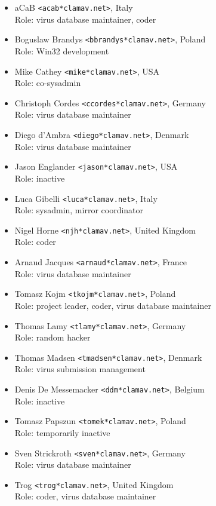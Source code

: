 \documentclass[a4paper,titlepage,12pt]{article}
\newcommand{\email}[1]{\texttt{#1}}
\begin{document}
    \begin{itemize}
	\item aCaB \email{<acab*clamav.net>}, Italy\\
	Role: virus database maintainer, coder

	\item Boguslaw Brandys \email{<bbrandys*clamav.net>}, Poland\\
	Role: Win32 development

	\item Mike Cathey \email{<mike*clamav.net>}, USA\\
	Role: co-sysadmin

	\item Christoph Cordes \email{<ccordes*clamav.net>}, Germany\\
	Role: virus database maintainer

	\item Diego d'Ambra \email{<diego*clamav.net>}, Denmark\\
	Role: virus database maintainer

	\item Jason Englander \email{<jason*clamav.net>}, USA\\
	Role: inactive

	\item Luca Gibelli \email{<luca*clamav.net>}, Italy\\
	Role: sysadmin, mirror coordinator

	\item Nigel Horne \email{<njh*clamav.net>}, United Kingdom\\
	Role: coder

	\item Arnaud Jacques \email{<arnaud*clamav.net>}, France\\
	Role: virus database maintainer

	\item Tomasz Kojm \email{<tkojm*clamav.net>}, Poland\\
	Role: project leader, coder, virus database maintainer

	\item Thomas Lamy \email{<tlamy*clamav.net>}, Germany\\
	Role: random hacker

	\item Thomas Madsen \email{<tmadsen*clamav.net>}, Denmark\\
	Role: virus submission management

	\item Denis De Messemacker \email{<ddm*clamav.net>}, Belgium\\
	Role: inactive

	\item Tomasz Papszun \email{<tomek*clamav.net>}, Poland\\
	Role: temporarily inactive

	\item Sven Strickroth \email{<sven*clamav.net>}, Germany\\
	Role: virus database maintainer

	\item Trog \email{<trog*clamav.net>}, United Kingdom\\
	Role: coder, virus database maintainer
    \end{itemize}
\end{document}
